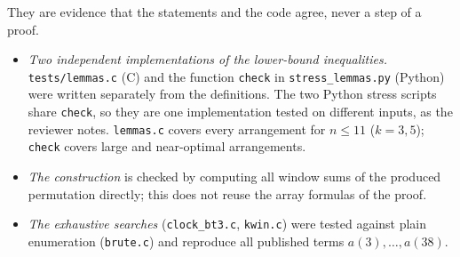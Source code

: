 \documentclass[11pt]{amsart}
\theoremstyle{remark}
\begin{document}
They are evidence that the statements and the code agree, never a step of a proof.
\begin{itemize}
\item \emph{Two independent implementations of the lower-bound inequalities.} \texttt{tests/lemmas.c} (C) and the
function \texttt{check} in \texttt{stress\_lemmas.py} (Python) were written separately from the definitions. The
two Python stress scripts share \texttt{check}, so they are one implementation tested on different inputs, as the
reviewer notes. \texttt{lemmas.c} covers every arrangement for $n\le11$ ($k=3,5$); \texttt{check} covers large and
near-optimal arrangements.
\item \emph{The construction} is checked by computing all window sums of the produced permutation directly; this does
not reuse the array formulas of the proof.
\item \emph{The exhaustive searches} (\texttt{clock\_bt3.c}, \texttt{kwin.c}) were tested against plain enumeration
(\texttt{brute.c}) and reproduce all published terms $a(3),\dots,a(38)$.
\end{itemize}
\end{document}
